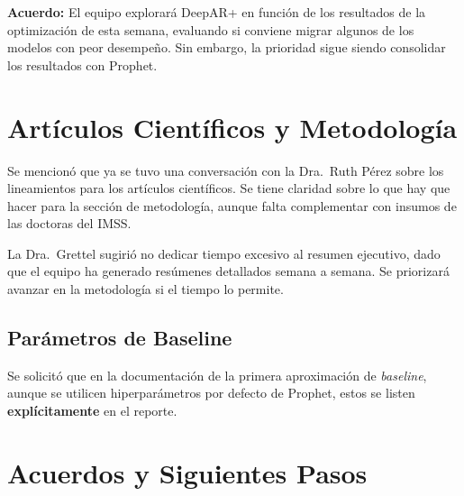 \documentclass[11pt,letterpaper]{article}
\begin{document}
\textbf{Acuerdo:} El equipo explorará DeepAR+ en función de los resultados de la optimización de esta semana, evaluando si conviene migrar algunos de los modelos con peor desempeño. Sin embargo, la prioridad sigue siendo consolidar los resultados con Prophet.

\section{Artículos Científicos y Metodología}

Se mencionó que ya se tuvo una conversación con la Dra.\ Ruth Pérez sobre los lineamientos para los artículos científicos. Se tiene claridad sobre lo que hay que hacer para la sección de metodología, aunque falta complementar con insumos de las doctoras del IMSS.

La Dra.\ Grettel sugirió no dedicar tiempo excesivo al resumen ejecutivo, dado que el equipo ha generado resúmenes detallados semana a semana. Se priorizará avanzar en la metodología si el tiempo lo permite.

\subsection{Parámetros de Baseline}

Se solicitó que en la documentación de la primera aproximación de \textit{baseline}, aunque se utilicen hiperparámetros por defecto de Prophet, estos se listen \textbf{explícitamente} en el reporte.

\section{Acuerdos y Siguientes Pasos}
\end{document}
